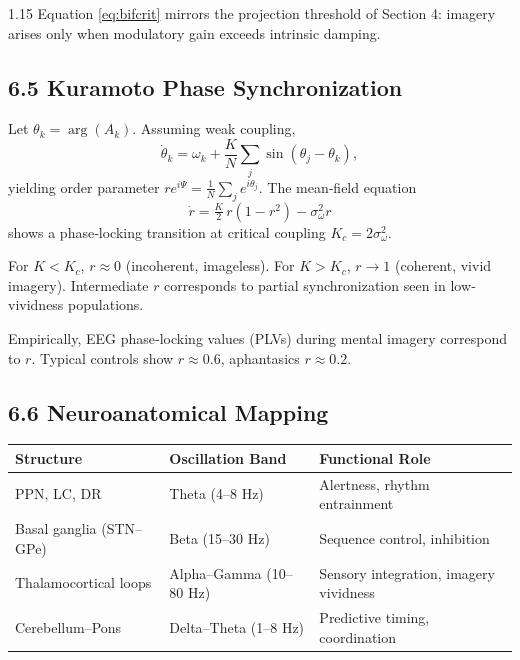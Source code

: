 \documentclass[12pt,a4paper]{article}
\begin{document}
\begin{spacing}{1.15}
Equation \eqref{eq:bifcrit} mirrors the projection threshold of Section 4: imagery arises only when modulatory gain exceeds intrinsic damping.

\subsection{6.5 Kuramoto Phase Synchronization}

Let $\theta_k\!=\!\arg(A_k)$.  Assuming weak coupling,
\begin{equation}
\dot\theta_k
 = \omega_k + \frac{K}{N}\sum_{j}\sin(\theta_j-\theta_k),
\label{eq:kuramoto}
\end{equation}
yielding order parameter
$r e^{i\Psi} = \tfrac{1}{N}\sum_j e^{i\theta_j}$.
The mean‐field equation
\[
\dot r = \tfrac{K}{2}\,r(1-r^2) - \sigma_\omega^2 r
\]
shows a phase‐locking transition at critical coupling $K_c = 2\sigma_\omega^2$.  

\begin{corollary}
For $K<K_c$, $r\!\approx\!0$ (incoherent, imageless).  
For $K>K_c$, $r\!\to\!1$ (coherent, vivid imagery).  
Intermediate $r$ corresponds to partial synchronization seen in low‐vividness populations.
\end{corollary}

Empirically, EEG phase‐locking values (PLVs) during mental imagery correspond to $r$.  Typical controls show $r\!\approx\!0.6$, aphantasics $r\!\approx\!0.2$.

\subsection{6.6 Neuroanatomical Mapping}

\begin{center}
\begin{tabular}{@{}lll@{}}
\toprule
Structure & Oscillation Band & Functional Role \\
\midrule
PPN, LC, DR & Theta (4–8 Hz) & Alertness, rhythm entrainment \\
Basal ganglia (STN–GPe) & Beta (15–30 Hz) & Sequence control, inhibition \\
Thalamocortical loops & Alpha–Gamma (10–80 Hz) & Sensory integration, imagery vividness \\
Cerebellum–Pons & Delta–Theta (1–8 Hz) & Predictive timing, coordination \\
\bottomrule
\end{tabular}
\end{center}


\end{spacing}
\end{document}
